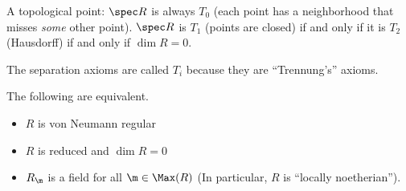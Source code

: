  A topological point: $\spec R$ is always $T_0$ (each point has a neighborhood that
 misses \emph{some} other point). $\spec R$ is $T_1$ (points are closed) if and only if
 it is $T_2$ (Hausdorff) if and only if $\dim R=0$.
 \begin{remark}
   The separation axioms are called $T_i$ because they are ``Trennung's'' axioms.
 \end{remark}
 \begin{corollary}
   The following are equivalent.
   \begin{itemize}
     \item $R$ is von Neumann regular
     \item $R$ is reduced and $\dim R=0$
     \item $R_\m$ is a field for all $\m\in \Max(R)$ (In particular, $R$ is
     ``locally noetherian'').
   \end{itemize}
 \end{corollary}


